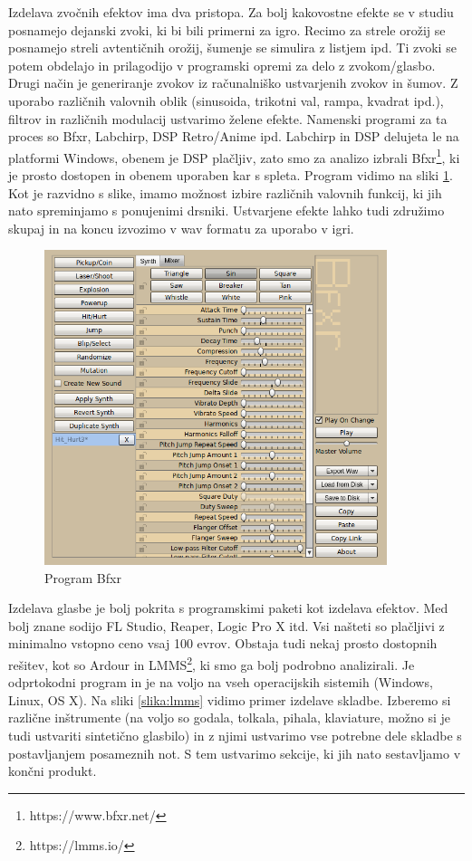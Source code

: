 \documentclass[12pt,a4paper,twoside]{book}
\begin{document}
Izdelava zvočnih efektov ima dva pristopa. Za bolj kakovostne efekte se v studiu posnamejo dejanski zvoki, ki bi bili primerni za igro. Recimo za strele orožij se posnamejo streli avtentičnih orožij, šumenje se simulira z listjem ipd. Ti zvoki se potem obdelajo in prilagodijo v programski opremi za delo z zvokom/glasbo. Drugi način je generiranje zvokov iz računalniško ustvarjenih zvokov in šumov. Z uporabo različnih valovnih oblik (sinusoida, trikotni val, rampa, kvadrat ipd.), filtrov in različnih modulacij ustvarimo želene efekte. Namenski programi za ta proces so Bfxr, Labchirp, DSP Retro/Anime ipd. Labchirp in DSP delujeta le na platformi Windows, obenem je DSP plačljiv, zato smo za analizo izbrali Bfxr\footnote{https://www.bfxr.net/}, ki je prosto dostopen in obenem uporaben kar s spleta. Program vidimo na sliki \ref{slika:bfxr}. Kot je razvidno s slike, imamo možnost izbire različnih valovnih funkcij, ki jih nato spreminjamo s ponujenimi drsniki. Ustvarjene efekte lahko tudi združimo skupaj in na koncu izvozimo v wav formatu za uporabo v igri.

\begin{figure}[h]
	\centering
	\includegraphics[width=10cm]{bfxr}
	\caption{Program Bfxr}
	\label{slika:bfxr}
\end{figure}

Izdelava glasbe je bolj pokrita s programskimi paketi kot izdelava efektov. Med bolj znane sodijo FL Studio, Reaper, Logic Pro X itd. Vsi našteti so plačljivi z minimalno vstopno ceno vsaj 100 evrov. Obstaja tudi nekaj prosto dostopnih rešitev, kot so Ardour in LMMS\footnote{https://lmms.io/}, ki smo ga bolj podrobno analizirali. Je odprtokodni program in je na voljo na vseh operacijskih sistemih (Windows, Linux, OS X). Na sliki \ref{slika:lmms} vidimo primer izdelave skladbe. Izberemo si različne inštrumente (na voljo so godala, tolkala, pihala, klaviature, možno si je tudi ustvariti sintetično glasbilo) in z njimi ustvarimo vse potrebne dele skladbe s postavljanjem posameznih not. S tem ustvarimo sekcije, ki jih nato sestavljamo v končni produkt.
\end{document}
